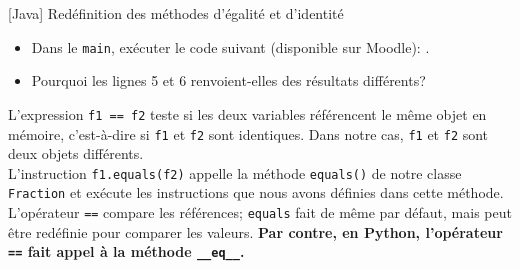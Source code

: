 \begin{Exercice}[30 minutes]{[Java] Redéfinition des méthodes d'égalité et d'identité}
\begin{itemize}
	\begin{itemize}
    \item Vérifier si \lstinline{this} et \lstinline{other} sont le même objet. Si oui, renvoyer \lstinline{true}.
    \item Vérifier si \lstinline{other} est \lstinline{null} ou si \lstinline{this} et \lstinline{other} sont de types différents. Si oui, renvoyer \lstinline{false}.
    \item Sinon, vérifier si les deux fractions sont numériquement égales (même si leurs numérateurs et dénominateurs sont différents) et renvoyer le résultat de cette comparaison.
\end{itemize}
	\begin{conseil}
		En Java, pour vérifier que deux objets sont de même type, vous pouvez accéder à la classe de chacun des éléments en utilisant la méthode \lstinline{getClass()} et les comparer. Une fois que vous avez vérifié le type de l'objet \lstinline{other} passé comme argument, le convertir en \lstinline{Fraction} (utiliser \href{https://moodle.unil.ch/mod/resource/view.php?id=2218919}{type casting de la semaine 3}).
	\end{conseil}
	\item Dans le \lstinline{main}, exécuter le code suivant (disponible sur Moodle): 
	.
	\item Pourquoi les lignes 5 et 6 renvoient-elles des résultats différents?	
\end{itemize}

\begin{solution}
	
\end{solution}
\begin{solution}
	L'expression \lstinline{f1 == f2} teste si les deux variables référencent le même objet en mémoire, c'est-à-dire si \lstinline{f1} et \lstinline{f2} sont identiques.
	Dans notre cas, \lstinline{f1} et \lstinline{f2} sont deux objets différents. \\

	L'instruction \lstinline{f1.equals(f2)} appelle la méthode \lstinline{equals()} de notre classe \lstinline{Fraction} et exécute les instructions que nous avons définies dans cette méthode.
	L'opérateur \lstinline{==} compare les références; \lstinline{equals} fait de même par défaut, mais peut être redéfinie pour comparer les valeurs.
	\textbf{Par contre, en Python, l'opérateur \lstinline|==| fait appel à la méthode \lstinline|__eq__|. }
\end{solution}

\end{Exercice}
	

